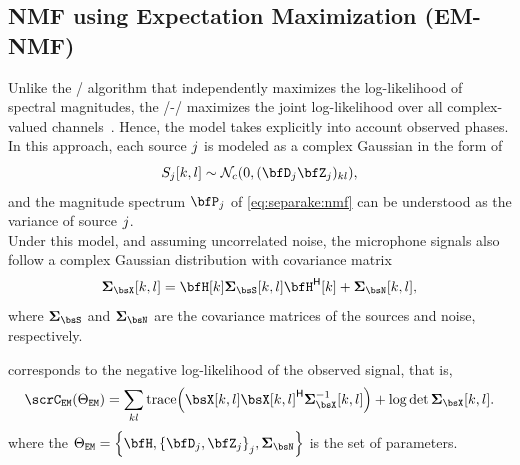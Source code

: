 \subsection{NMF using Expectation Maximization (EM-NMF)}\label{sec:separake:em}
Unlike the \MU/ algorithm that independently maximizes the log-likelihood of spectral magnitudes, the \EM/-\NMF/ maximizes the joint log-likelihood over all complex-valued channels~.
Hence, the model takes explicitly into account observed phases.
In this approach, each source $j$ is modeled as a complex Gaussian in the form of
\begin{equation}
    \SRC_\idxSrc[k,l] \sim \mathcal{N}_c \kparen{0, (\mD_\idxSrc\mZ_\idxSrc)_{kl}},
\end{equation}
and the magnitude spectrum $\mP_\idxSrc$ of \eqref{eq:separake:nmf} can be understood as the variance of source $j$.
\\Under this model, and assuming uncorrelated noise, the microphone signals also follow a complex Gaussian distribution with covariance matrix
\begin{equation}
    \mSigma_{\MICS}[k,l] = \FLTSS[k] \mSigma_{\SRCS} [k,l] \khermitian{\FLTSS}[k] + \mSigma_{\NSES}[k,l]
    ,
\end{equation}
where $\mSigma_{\SRCS}$ and $\mSigma_{\NSES}$ are the covariance matrices of the sources and noise, respectively.

 corresponds to the negative log-likelihood of the observed signal, that is,
\begin{equation}\label{eq:separake:loglike}
    \scrC_{\mathtt{EM}}(\Theta_{\mathtt{EM}}) = \sum\limits_{kl} \trace\kparen{\MICS[k,l] \khermitian{\MICS[k,l]} \mSigma_{\MICS}^{-1}[k,l]} \\
    + \log\det\mSigma_{\MICS}[k,l].
\end{equation}
where the $\Theta_{\mathtt{EM}} = \set{\FLTSS, \set{\mD_\idxSrc, \mZ_\idxSrc}_\idxSrc, \mSigma_{\NSES}}$ is the set of parameters.

